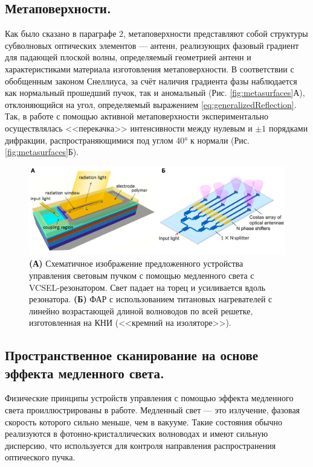 \subsection{Метаповерхности.}
Как было сказано в параграфе 2, метаповерхности представляют собой структуры субволновых оптических элементов --- антенн, реализующих фазовый градиент для падающей плоской волны, определяемый геометрией антенн и характеристиками материала изготовления метаповерхности. В соответствии с обобщенным законом Снеллиуса, за счёт наличия градиента фазы наблюдается как нормальный прошедший пучок, так и аномальный (Рис. \ref{fig:metasurfaces}А), отклоняющийся на угол, определяемый выражением \eqref{eq:generalizedReflection}. Так, в работе\cite{huang2016gate} с помощью активной метаповерхности экспериментально осуществлялась <<перекачка>> интенсивности между нулевым и $\pm1$ порядками дифракции, распространяющимися под углом 40° к нормали (Рис. \ref{fig:metasurfaces}Б).

\begin{figure}
    \begin{center}
        \includegraphics[width=\textwidth]{pictures/Slow_Light.png}
        \caption{\textbf{(А)} Схематичное изображение предложенного устройства управления световым пучком с помощью медленного света с VCSEL-резонатором. Свет падает на торец и усиливается вдоль резонатора\cite{gu2011giant}. \textbf{(Б)} ФАР с использованием титановых нагревателей с линейно возрастающей длиной волноводов по всей решетке, изготовленная на КНИ (<<кремний на изоляторе>>)\cite{van2009off}.}
        \label{fig:slowLight}
    \end{center}
\end{figure}

\subsection{Пространственное сканирование на основе эффекта медленного света.}
Физические принципы устройств управления с помощью эффекта медленного света проиллюстрированы в работе\cite{gu2011giant}. Медленный свет --- это излучение, фазовая скорость которого сильно меньше, чем в вакууме. Такие состояния обычно реализуются в фотонно-кристаллических волноводах и имеют сильную дисперсию, что используется для контроля направления распространения оптического пучка.

